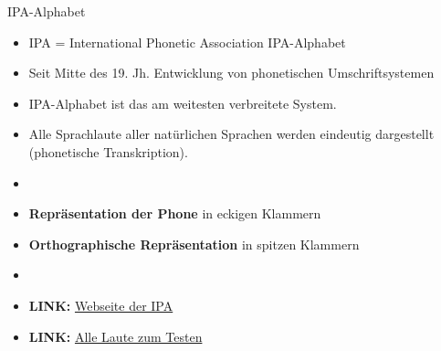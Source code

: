 \begin{frame}{IPA-Alphabet}

	\begin{itemize}
		\item IPA = International Phonetic Association \ras IPA-Alphabet
		\item Seit Mitte des 19. Jh. \ras Entwicklung von phonetischen Umschriftsystemen
		\item IPA-Alphabet ist das am weitesten verbreitete System.
		\item Alle Sprachlaute aller natürlichen Sprachen werden eindeutig dargestellt (phonetische Transkription).
		\item[]
		\item \textbf{Repräsentation der Phone} \ras in eckigen Klammern \gqq{\textipa{[ ]}}
		\item \textbf{Orthographische Repräsentation} \ras in spitzen Klammern \gqq{$\langle{} \rangle{}$}
		\item[]
		\item \textbf{LINK:} \href{http://internationalphoneticassociation.org}{Webseite der IPA}
		\item \textbf{LINK:} \href{http://phonetics.ucla.edu/course/chapter1/chapter1.html}{Alle Laute zum Testen}
	\end{itemize}
	
\end{frame}



%
%		
%	

